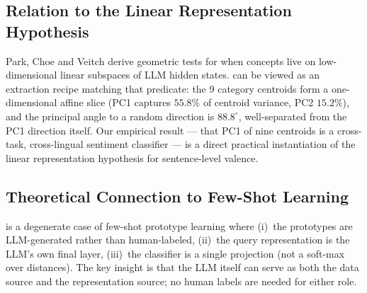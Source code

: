 \subsection{Relation to the Linear Representation Hypothesis}

Park, Choe and Veitch \cite{park2024linear} derive geometric tests for
when concepts live on low-dimensional linear subspaces of LLM hidden
states. \ours{} can be viewed as an extraction recipe matching that
predicate: the 9 category centroids form a one-dimensional affine
slice (PC1 captures $55.8\%$ of centroid variance, PC2 $15.2\%$),
and the principal angle to a random direction is $88.8^\circ$,
well-separated from the PC1 direction itself. Our empirical result ---
that PC1 of nine centroids is a cross-task, cross-lingual sentiment
classifier --- is a direct practical instantiation of the linear
representation hypothesis for sentence-level valence.

\subsection{Theoretical Connection to Few-Shot Learning}

\ours{} is a degenerate case of few-shot prototype learning
\cite{snell2017prototypical} where (i)~the prototypes are LLM-generated
rather than human-labeled, (ii)~the query representation is the LLM's own
final layer, (iii)~the classifier is a single projection (not a soft-max
over distances). The key insight is that the LLM itself can serve as both
the data source and the representation source; no human labels are needed
for either role.
